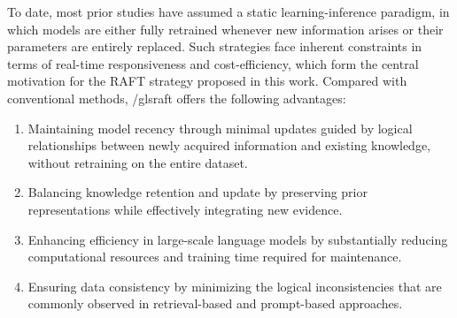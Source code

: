 \documentclass[a4paper,fleqn]{cas-sc}
\begin{document}
To date, most prior studies have assumed a static learning-inference paradigm, in which models are either fully retrained whenever new information arises or their parameters are entirely replaced. Such strategies face inherent constraints in terms of real-time responsiveness and cost-efficiency, which form the central motivation for the RAFT strategy proposed in this work. Compared with conventional methods, /gls{raft} offers the following advantages:
\begin{enumerate}
	\item{
    Maintaining model recency through minimal updates guided by logical relationships between newly acquired information and existing knowledge, without retraining on the entire dataset.}
	\item{
    Balancing knowledge retention and update by preserving prior representations while effectively integrating new evidence.}
	\item{
    Enhancing efficiency in large-scale language models by substantially reducing computational resources and training time required for maintenance.}
	\item{
    Ensuring data consistency by minimizing the logical inconsistencies that are commonly observed in retrieval-based and prompt-based approaches.}
\end{enumerate}
\end{document}
